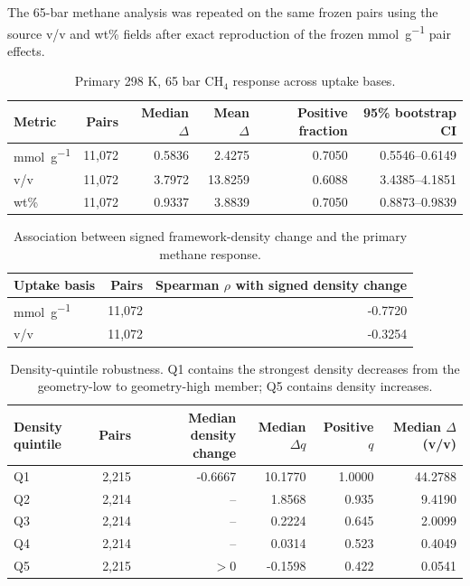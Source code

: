 \documentclass[11pt,a4paper]{article}
\begin{document}
The 65-bar methane analysis was repeated on the same frozen pairs using the source
v/v and wt\% fields after exact reproduction of the frozen
\si{\milli\mole\per\gram} pair effects.

\begin{table}[H]
\centering
\caption{Primary 298 K, 65 bar CH$_4$ response across uptake bases.}
\label{tab:S28}
\begin{tabular}{lrrrrr}
\toprule
Metric & Pairs & Median $\Delta$ & Mean $\Delta$ & Positive fraction & 95\% bootstrap CI \\
\midrule
\si{\milli\mole\per\gram} & 11,072 & 0.5836 & 2.4275 & 0.7050 & 0.5546--0.6149 \\
v/v & 11,072 & 3.7972 & 13.8259 & 0.6088 & 3.4385--4.1851 \\
wt\% & 11,072 & 0.9337 & 3.8839 & 0.7050 & 0.8873--0.9839 \\
\bottomrule
\end{tabular}
\end{table}

\begin{table}[H]
\centering
\caption{Association between signed framework-density change and the primary
methane response.}
\label{tab:S29}
\begin{tabular}{lrr}
\toprule
Uptake basis & Pairs & Spearman $\rho$ with signed density change \\
\midrule
\si{\milli\mole\per\gram} & 11,072 & -0.7720 \\
v/v & 11,072 & -0.3254 \\
\bottomrule
\end{tabular}
\end{table}

\begin{table}[H]
\centering
\caption{Density-quintile robustness. Q1 contains the strongest density decreases
from the geometry-low to geometry-high member; Q5 contains density increases.}
\label{tab:S30}
\begin{tabular}{lrrrrr}
\toprule
Density quintile & Pairs & Median density change & Median $\Delta q$ & Positive $q$ & Median $\Delta$(v/v) \\
\midrule
Q1 & 2,215 & -0.6667 & 10.1770 & 1.0000 & 44.2788 \\
Q2 & 2,214 & -- & 1.8568 & 0.935 & 9.4190 \\
Q3 & 2,214 & -- & 0.2224 & 0.645 & 2.0099 \\
Q4 & 2,214 & -- & 0.0314 & 0.523 & 0.4049 \\
Q5 & 2,215 & $>0$ & -0.1598 & 0.422 & 0.0541 \\
\bottomrule
\end{tabular}
\end{table}
\end{document}
